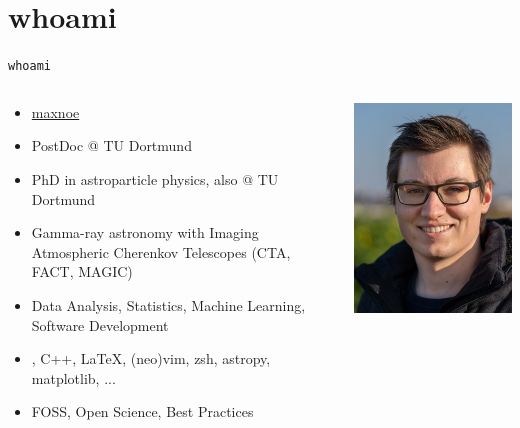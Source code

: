 \section{whoami}
\begin{frame}[c, fragile]{\texttt{whoami}}
  \begin{columns}[onlytextwidth, T]%
    \begin{column}{0.8\textwidth}%
      \begin{itemize}
        \item[{\Large\faGithub}] \href{https://github.com/maxnoe}{maxnoe}
        \item[{\Large\faUniversity}] PostDoc @ TU Dortmund
        \item[{\Large\faGraduationCap}] PhD in astroparticle physics, also @ TU Dortmund
        \item[{\Large\faFlask}] Gamma-ray astronomy with Imaging Atmospheric Cherenkov Telescopes (CTA, FACT, MAGIC)
        \item[{\Large\faMicroscope}] Data Analysis, Statistics, Machine Learning, Software Development
        \item[{\Large\faLaptopCode}] \faPython, C++, \LaTeX{}, (neo)vim, zsh, astropy, matplotlib, ...
        \item[{\Large\faHeart}] FOSS, Open Science, Best Practices
      \end{itemize}
    \end{column}%
    \hfill%
    \begin{column}{0.19\textwidth}%
      \includegraphics[height=\textwidth]{images/max.jpg}
    \end{column}%
  \end{columns}%
\end{frame}

\copywarning{}








